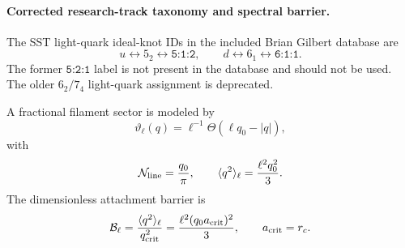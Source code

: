 \paragraph{Corrected research-track taxonomy and spectral barrier.}
The SST light-quark ideal-knot IDs in the included Brian Gilbert database are
\[
u\longleftrightarrow5_2\longleftrightarrow\texttt{5:1:2},
\qquad
d\longleftrightarrow6_1\longleftrightarrow\texttt{6:1:1}.
\]
The former \(\texttt{5:2:1}\) label is not present in the database and should
not be used. The older \(6_2/7_4\) light-quark assignment is deprecated.

A fractional filament sector is modeled by
\[
\vartheta_\ell(q)=\ell^{-1}\Theta(\ell q_0-|q|),
\]
with
\[
\mathcal{N}_{\rm line}=\frac{q_0}{\pi},
\qquad
\langle q^2\rangle_\ell=\frac{\ell^2q_0^2}{3}.
\]
The dimensionless attachment barrier is
\[
\mathcal{B}_\ell
=
\frac{\langle q^2\rangle_\ell}{q_{\rm crit}^2}
=
\frac{\ell^2(q_0a_{\rm crit})^2}{3},
\qquad
a_{\rm crit}=r_c.
\]
